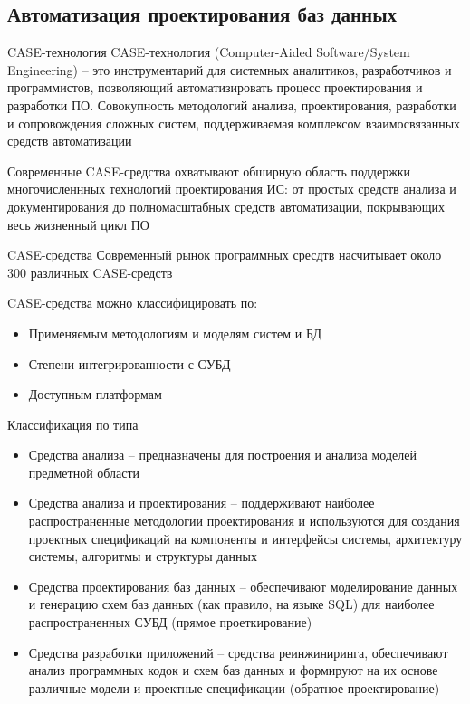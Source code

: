 \documentclass[12pt]{article}
\begin{document}
\newpage 

\subsection{Автоматизация проектирования баз данных}

\begin{defin}{CASE-технология}
    CASE-технология (Computer-Aided Software/System Engineering) -- это инструментарий для системных аналитиков, разработчиков и программистов, позволяющий автоматизировать процесс проектирования и разработки ПО. Совокупность методологий анализа, проектирования, разработки и сопровождения сложных систем, поддерживаемая комплексом взаимосвязанных средств автоматизации 

    Современные CASE-средства охватывают обширную область поддержки многочисленнных технологий проектирования ИС: от простых средств анализа и документирования до полномасштабных средств автоматизации, покрывающих весь жизненный цикл ПО 
\end{defin}

\begin{defin}{CASE-средства}
    Современный рынок программных сресдтв насчитывает около 300 различных CASE-средств 

    CASE-средства можно классифицировать по: 

    \begin{itemize}
        \item Применяемым методологиям и моделям систем и БД 
        \item Степени интегрированности с СУБД 
        \item Доступным платформам 
    \end{itemize}
\end{defin}

\begin{nota}{Классификация по типа}
    \begin{itemize}
        \item Средства анализа -- предназначены для построения и анализа моделей предметной области 
        \item Средства анализа и проектирования -- поддерживают наиболее распространенные методологии проектирования и используются для создания проектных спецификаций на компоненты и интерфейсы системы, архитектуру системы, алгоритмы и структуры данных 
        \item Средства проектирования баз данных -- обеспечивают моделирование данных и генерацию схем баз данных (как правило, на языке SQL) для наиболее распространенных СУБД (прямое проеткирование)
        \item Средства разработки приложений -- средства реинжиниринга, обеспечивают анализ программных кодок и схем баз данных и формируют на их основе различные модели и проектные спецификации (обратное проектирование)
    \end{itemize}
\end{nota}
\end{document}
